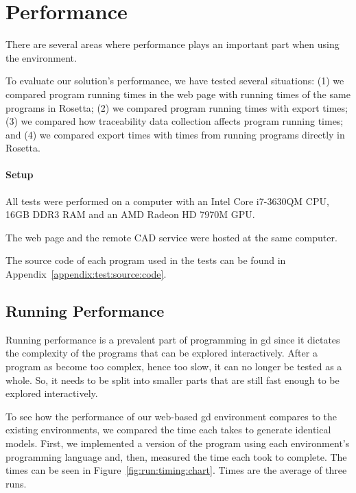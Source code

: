 

\section{Performance}
There are several areas where performance plays an important part when using the environment.

To evaluate our solution's performance, we have tested several situations: (1) we compared program running times in the web page with running times of the same programs in Rosetta; (2) we compared program running times with export times; (3) we compared how traceability data collection affects program running times; and (4) we compared export times with times from running programs directly in Rosetta.

\paragraph{Setup}
All tests were performed on a computer with an Intel Core i7-3630QM CPU, 16GB DDR3 RAM and an AMD Radeon HD 7970M GPU.

The web page and the remote CAD service were hosted at the same computer.

The source code of each program used in the tests can be found in Appendix~\ref{appendix:test:source:code}. %


\subsection{Running Performance}
Running performance is a prevalent part of programming in \gls{gd} since it dictates the complexity of the programs that can be explored interactively.
After a program as become too complex, hence too slow, it can no longer be tested as a whole.
So, it needs to be split into smaller parts that are still fast enough to be explored interactively.

To see how the performance of our web-based \gls{gd} environment compares to the existing environments, we compared the time each takes to generate identical models.
First, we implemented a version of the program using each environment's programming language and, then, measured the time each took to complete.
The times can be seen in Figure~\ref{fig:run:timing:chart}.
Times are the average of three runs.


